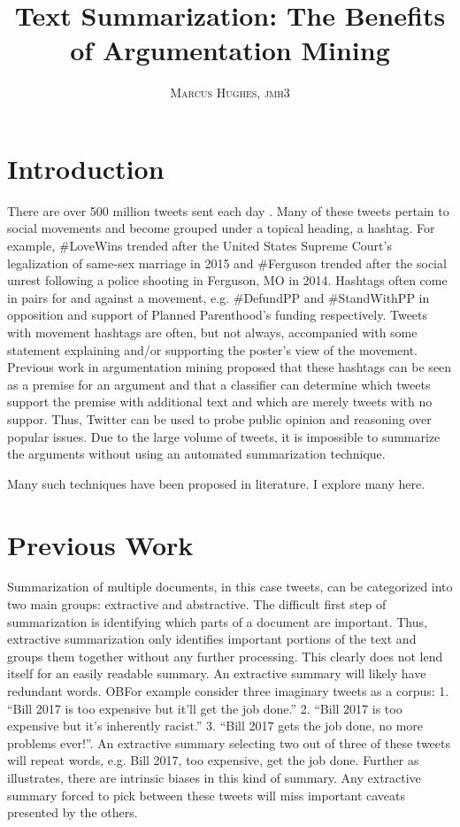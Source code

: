 \documentclass[paper=letter, fontsize=12pt]{article}
\title{\vspace{-15mm}\fontsize{24pt}{10pt}\selectfont\textbf{Text Summarization: The Benefits of Argumentation Mining}} %
\author{
\large
{\textsc{Marcus Hughes, jmh3 }}\\[2mm]
}
\date{}
\begin{document}
\maketitle %
\thispagestyle{fancy} %


\begin{abstract}

\end{abstract}

\section{Introduction}
There are over 500 million tweets sent each day . Many of these tweets pertain to social movements and become grouped under a topical heading, a hashtag. For example, \#LoveWins trended after the United States Supreme Court's legalization of same-sex marriage in 2015 and \#Ferguson trended after the social unrest following a police shooting in Ferguson, MO in 2014. Hashtags often come in pairs for and against a movement, e.g. \#DefundPP and \#StandWithPP in opposition and support of Planned Parenthood's funding respectively. Tweets with movement hashtags are often, but not always, accompanied with some statement explaining and/or supporting the poster's view of the movement. Previous work in argumentation mining proposed that these hashtags can be seen as a premise for an argument and that a classifier can determine which tweets support the premise with additional text and which are merely tweets with no suppor. Thus, Twitter can be used to probe public opinion and reasoning over popular issues. Due to the large volume of tweets, it is impossible to summarize the arguments without using an automated summarization technique.

Many such techniques have been proposed in literature. I explore many here.

\section{Previous Work}
Summarization of multiple documents, in this case tweets, can be categorized into two main groups: extractive and abstractive. The difficult first step of summarization is identifying which parts of a document are important. Thus, extractive summarization only identifies important portions of the text and groups them together without any further processing. This clearly does not lend itself for an easily readable summary. An extractive summary will likely have redundant words. OBFor example consider three imaginary tweets as a corpus: 1. ``Bill 2017 is too expensive but it'll get the job done.'' 2. ``Bill 2017 is too expensive but it's inherently racist.'' 3. ``Bill 2017 gets the job done, no more problems ever!''. An extractive summary selecting two out of three of these tweets will repeat words, e.g. Bill 2017, too expensive, get the job done. Further as \cite{Ganesan2010} illustrates, there are intrinsic biases in this kind of summary. Any extractive summary forced to pick between these tweets will miss important caveats presented by the others.
\end{document}
